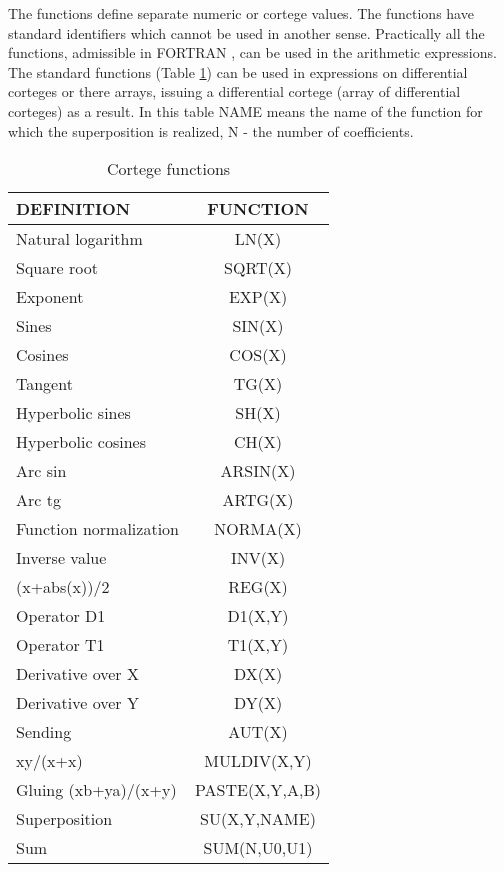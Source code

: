 The functions define separate numeric or cortege values. The functions have
standard identifiers which cannot be used in another sense. Practically all
the functions, admissible in FORTRAN , can be used in the arithmetic
expressions. The standard functions (Table \ref{t1}) can be used in
expressions on differential corteges or there arrays, issuing a differential
cortege (array of differential corteges) as a result. In this table NAME
means the name of the function for which the superposition is realized, N -
the number of coefficients.

{\begin{table}
  \begin{center}
  \begin{tabular}{|l|c|} \hline
   { DEFINITION}         & { FUNCTION} \\ \hline
   Natural logarithm        & LN(X)       \\
   Square root              & SQRT(X)     \\
   Exponent                 & EXP(X)      \\
   Sines                    & SIN(X)      \\
   Cosines                  & COS(X)      \\
   Tangent                  & TG(X)       \\ \hline
   Hyperbolic sines         & SH(X)       \\
   Hyperbolic cosines       & CH(X)       \\
   Arc sin                  & ARSIN(X)    \\
   Arc tg                   & ARTG(X)     \\ \hline
   Function normalization   & NORMA(X)    \\
   Inverse value            & INV(X)      \\
   (x+abs(x))/2             & REG(X)      \\ \hline
   Operator D1              & D1(X,Y)     \\
   Operator T1              & T1(X,Y)     \\
   Derivative over X        & DX(X)       \\
   Derivative over Y        & DY(X)       \\
   Sending                  & AUT(X)      \\ \hline
   xy/(x+x)                 & MULDIV(X,Y) \\
   Gluing (xb+ya)/(x+y)     & PASTE(X,Y,A,B) \\ \hline
   Superposition            & SU(X,Y,NAME) \\ \hline
   Sum                      & SUM(N,U0,U1) \\ \hline
  \end{tabular}
  \end{center}
  \caption{Cortege functions\label{t1}}
\end{table}}

